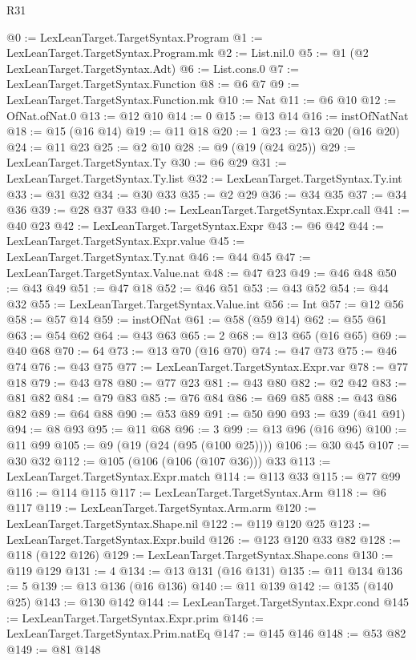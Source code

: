 \begin{lexlean}{R31}
\begin{coremodule}
@0 := LexLeanTarget.TargetSyntax.Program
@1 := LexLeanTarget.TargetSyntax.Program.mk
@2 := List.nil.{0}
@5 := @1 (@2 LexLeanTarget.TargetSyntax.Adt)
@6 := List.cons.{0}
@7 := LexLeanTarget.TargetSyntax.Function
@8 := @6 @7
@9 := LexLeanTarget.TargetSyntax.Function.mk
@10 := Nat
@11 := @6 @10
@12 := OfNat.ofNat.{0}
@13 := @12 @10
@14 := 0
@15 := @13 @14
@16 := instOfNatNat
@18 := @15 (@16 @14)
@19 := @11 @18
@20 := 1
@23 := @13 @20 (@16 @20)
@24 := @11 @23
@25 := @2 @10
@28 := @9 (@19 (@24 @25))
@29 := LexLeanTarget.TargetSyntax.Ty
@30 := @6 @29
@31 := LexLeanTarget.TargetSyntax.Ty.list
@32 := LexLeanTarget.TargetSyntax.Ty.int
@33 := @31 @32
@34 := @30 @33
@35 := @2 @29
@36 := @34 @35
@37 := @34 @36
@39 := @28 @37 @33
@40 := LexLeanTarget.TargetSyntax.Expr.call
@41 := @40 @23
@42 := LexLeanTarget.TargetSyntax.Expr
@43 := @6 @42
@44 := LexLeanTarget.TargetSyntax.Expr.value
@45 := LexLeanTarget.TargetSyntax.Ty.nat
@46 := @44 @45
@47 := LexLeanTarget.TargetSyntax.Value.nat
@48 := @47 @23
@49 := @46 @48
@50 := @43 @49
@51 := @47 @18
@52 := @46 @51
@53 := @43 @52
@54 := @44 @32
@55 := LexLeanTarget.TargetSyntax.Value.int
@56 := Int
@57 := @12 @56
@58 := @57 @14
@59 := instOfNat
@61 := @58 (@59 @14)
@62 := @55 @61
@63 := @54 @62
@64 := @43 @63
@65 := 2
@68 := @13 @65 (@16 @65)
@69 := @40 @68
@70 := 64
@73 := @13 @70 (@16 @70)
@74 := @47 @73
@75 := @46 @74
@76 := @43 @75
@77 := LexLeanTarget.TargetSyntax.Expr.var
@78 := @77 @18
@79 := @43 @78
@80 := @77 @23
@81 := @43 @80
@82 := @2 @42
@83 := @81 @82
@84 := @79 @83
@85 := @76 @84
@86 := @69 @85
@88 := @43 @86 @82
@89 := @64 @88
@90 := @53 @89
@91 := @50 @90
@93 := @39 (@41 @91)
@94 := @8 @93
@95 := @11 @68
@96 := 3
@99 := @13 @96 (@16 @96)
@100 := @11 @99
@105 := @9 (@19 (@24 (@95 (@100 @25))))
@106 := @30 @45
@107 := @30 @32
@112 := @105 (@106 (@106 (@107 @36))) @33
@113 := LexLeanTarget.TargetSyntax.Expr.match
@114 := @113 @33
@115 := @77 @99
@116 := @114 @115
@117 := LexLeanTarget.TargetSyntax.Arm
@118 := @6 @117
@119 := LexLeanTarget.TargetSyntax.Arm.arm
@120 := LexLeanTarget.TargetSyntax.Shape.nil
@122 := @119 @120 @25
@123 := LexLeanTarget.TargetSyntax.Expr.build
@126 := @123 @120 @33 @82
@128 := @118 (@122 @126)
@129 := LexLeanTarget.TargetSyntax.Shape.cons
@130 := @119 @129
@131 := 4
@134 := @13 @131 (@16 @131)
@135 := @11 @134
@136 := 5
@139 := @13 @136 (@16 @136)
@140 := @11 @139
@142 := @135 (@140 @25)
@143 := @130 @142
@144 := LexLeanTarget.TargetSyntax.Expr.cond
@145 := LexLeanTarget.TargetSyntax.Expr.prim
@146 := LexLeanTarget.TargetSyntax.Prim.natEq
@147 := @145 @146
@148 := @53 @82
@149 := @81 @148

\end{coremodule}
\end{lexlean}

